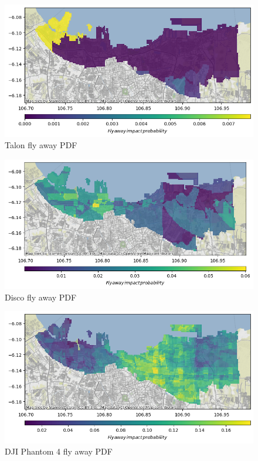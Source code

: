 \documentclass[12pt]{report}
\begin{document}
        \begin{figure}[H]
            \centering
            \includegraphics[width=\textwidth]{Plot/talon/fly_away_pdf.png}
            \caption{Talon fly away PDF}
            \label{fig:talon_flyaway}
        \end{figure}
        \begin{figure}[H]
            \centering
            \includegraphics[width=\textwidth]{Plot/parrot/fly_away_pdf.png}
            \caption{Disco fly away PDF}
            \label{fig:disco_flyaway}
        \end{figure}
        \begin{figure}[H]
            \centering
            \includegraphics[width=\textwidth]{Plot/phantom4/fly_away_pdf.png}
            \caption{DJI Phantom 4 fly away PDF}
            \label{fig:phantom_flyaway}
        \end{figure}
\end{document}
